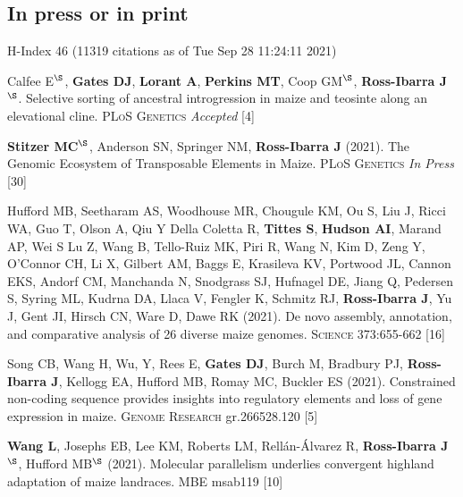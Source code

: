 \documentclass[letterpaper,10pt]{article}
\begin{document}
\subsection*{In press or in print} %
 {\small H-Index 46 (11319 citations as of Tue Sep 28 11:24:11 2021)}

\begin{etaremune}
\setlength\itemsep{0ex}


\item Calfee E$^\S$, \textbf{Gates DJ}, \textbf{Lorant A}, \textbf{Perkins MT}, Coop GM$^\S$, \textbf{Ross-Ibarra J}$^\S$. Selective sorting of ancestral introgression in maize and teosinte along an elevational cline. \textsc{PLoS Genetics} \textit{Accepted}
 [4]\\

\item \textbf{Stitzer MC}$^\S$, Anderson SN, Springer NM, \textbf{Ross-Ibarra J} (2021). The Genomic Ecosystem of Transposable Elements in Maize. \textsc{PLoS Genetics} \textit{In Press}
 [30]\\

\item Hufford MB, Seetharam AS, Woodhouse MR, Chougule KM, Ou S, Liu J, Ricci WA, Guo T, Olson A, Qiu Y Della Coletta R, \textbf{Tittes S}, \textbf{Hudson AI},  Marand AP, Wei S Lu Z, Wang B, Tello-Ruiz MK, Piri R, Wang N, Kim D, Zeng Y, O'Connor CH, Li X, Gilbert AM, Baggs E, Krasileva KV, Portwood JL, Cannon EKS, Andorf CM, Manchanda N, Snodgrass SJ, Hufnagel DE, Jiang Q, Pedersen S, Syring ML, Kudrna DA, Llaca V, Fengler K, Schmitz RJ, \textbf{Ross-Ibarra J}, Yu J, Gent JI, Hirsch CN, Ware D, Dawe RK (2021). De novo assembly, annotation, and comparative analysis of 26 diverse maize genomes. \textsc{Science} 373:655-662
 [16]\\

\item Song CB, Wang H, Wu, Y, Rees E, \textbf{Gates DJ}, Burch M,  Bradbury PJ, \textbf{Ross-Ibarra J}, Kellogg EA, Hufford MB, Romay MC, Buckler ES (2021).  Constrained non-coding sequence provides insights into regulatory elements and loss of gene expression in maize. \textsc{Genome Research} gr.266528.120 %
 [5]\\

\item \textbf{Wang L}, Josephs EB, Lee KM, Roberts LM, Rell\'{a}n-\'{A}lvarez R, \textbf{Ross-Ibarra J}$^\S$, Hufford MB$^\S$ (2021). Molecular parallelism underlies convergent highland adaptation of maize landraces. \textsc{MBE} msab119 %
 [10]\\


\end{etaremune}
\end{document}
